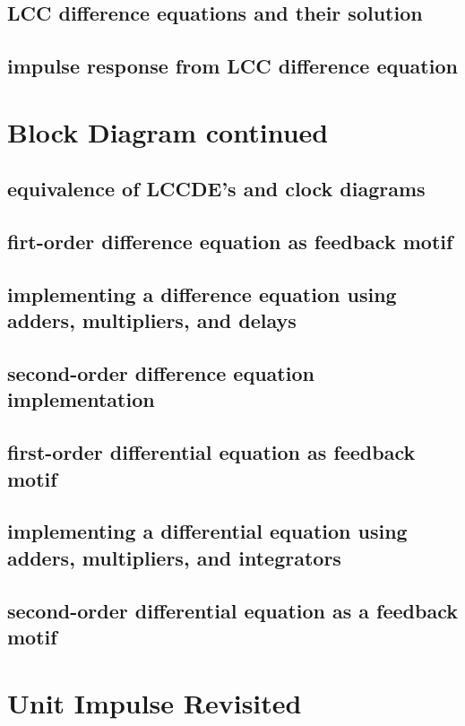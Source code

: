 \documentclass{article}
\begin{document}
\subsection{LCC difference equations and their solution}
\label{sec:org17be1e7}
\subsection{impulse response from LCC difference equation}
\label{sec:org96b828a}

\newpage
\section{Block Diagram continued}
\label{sec:orgcb5c75f}
\subsection{equivalence of LCCDE's and clock diagrams}
\label{sec:org36f6bc1}
\subsection{firt-order difference equation as feedback motif}
\label{sec:orgd43ce46}
\subsection{implementing a difference equation using adders, multipliers, and delays}
\label{sec:org7e3b256}
\subsection{second-order difference equation implementation}
\label{sec:org86279c9}
\subsection{first-order differential equation as feedback motif}
\label{sec:org3fcff6e}
\subsection{implementing a differential equation using adders, multipliers, and integrators}
\label{sec:org60f5c97}
\subsection{second-order differential equation as a feedback motif}
\label{sec:orgcc26b56}

\newpage
\section{Unit Impulse Revisited}
\label{sec:org9c858ee}
\end{document}
